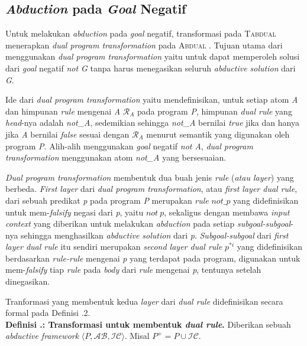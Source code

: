 \subsection{\textit{Abduction} pada \textit{Goal} Negatif}

Untuk melakukan \textit{abduction} pada \textit{goal} negatif, transformasi pada \textsc{Tabdual} menerapkan \textit{dual program transformation} pada \textsc{Abdual} \citep{alferes2004abduction}. Tujuan utama dari menggunakan \textit{dual program transformation} yaitu untuk dapat memperoleh solusi dari \textit{goal} negatif \textit{not G} tanpa harus menegasikan seluruh \textit{abductive solution} dari \textit{G}.

Ide dari \textit{dual program transformation} yaitu mendefinisikan, untuk setiap atom \textit{A} dan himpunan \textit{rule} mengenai \textit{A} $\mathcal{R}_A$ pada program \textit{P}, himpunan \textit{dual rule} yang \textit{head}-nya adalah \textit{not\_A}, sedemikian sehingga \textit{not\_A} bernilai \textit{true} jika dan hanya jika \textit{A} bernilai \textit{false} sesuai dengan $\mathcal{R}_A$ menurut semantik yang digunakan oleh program \textit{P}. Alih-alih menggunakan \textit{goal} negatif \textit{not A}, \textit{dual program transformation} menggunakan atom \textit{not\_A} yang bersesuaian. 

\textit{Dual program transformation} membentuk dua buah jenis \textit{rule} (\textit{atau layer}) yang berbeda. \textit{First layer} dari \textit{dual program transformation}, atau \textit{first layer dual rule}, dari sebuah predikat \textit{p} pada program \textit{P} merupakan \textit{rule} $not\_p$ yang didefinisikan untuk mem-\textit{falsify} negasi dari \textit{p}, yaitu $not \ p$, sekaligus dengan membawa \textit{input context} yang diberikan untuk melakukan \textit{abduction} pada setiap \textit{subgoal-subgoal}-nya sehingga menghasilkan \textit{abductive solution} dari \textit{p}. \textit{Subgoal-subgoal} dari \textit{first layer dual rule} itu sendiri merupakan \textit{second layer dual rule} $p^{*i}$ yang didefinisikan berdasarkan \textit{rule-rule} mengenai \textit{p} yang terdapat pada program, digunakan untuk mem-\textit{falsify} tiap \textit{rule} pada \textit{body} dari \textit{rule} mengenai \textit{p}, tentunya setelah dinegasikan.

Tranformasi yang membentuk kedua \textit{layer} dari \textit{dual rule} didefinisikan secara formal pada Definisi \thebabTigaNum.2.
\\

\noindent \textbf{Definisi \thebabTigaNum.\thedefBabTiga: Transformasi untuk membentuk \textit{dual rule}.} Diberikan sebuah \textit{abductive framework} $\langle  P,\mathcal{AB},\mathcal{IC} \rangle$. Misal $P^+ = P \cup \mathcal{IC}$.


